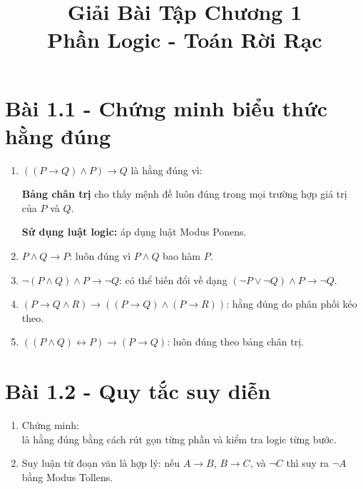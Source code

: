 \documentclass[12pt]{article}
\title{Giải Bài Tập Chương 1 \\[0.5em] \large Phần Logic - Toán Rời Rạc}
\date{}
\begin{document}
\maketitle

\section*{Bài 1.1 - Chứng minh biểu thức hằng đúng}

\begin{enumerate}[label=\alph*)]
    \item $((P \rightarrow Q) \land P) \rightarrow Q$ là hằng đúng vì:

    \textbf{Bảng chân trị} cho thấy mệnh đề luôn đúng trong mọi trường hợp giá trị của $P$ và $Q$.

    \textbf{Sử dụng luật logic:} áp dụng luật Modus Ponens.

    \item $P \land Q \rightarrow P$: luôn đúng vì $P \land Q$ bao hàm $P$.

    \item $\neg(P \land Q) \land P \rightarrow \neg Q$: có thể biến đổi về dạng $(\neg P \lor \neg Q) \land P \rightarrow \neg Q$.

    \item $(P \rightarrow Q \land R) \rightarrow ((P \rightarrow Q) \land (P \rightarrow R))$: hằng đúng do phân phối kéo theo.

    \item $((P \land Q) \leftrightarrow P) \rightarrow (P \rightarrow Q)$: luôn đúng theo bảng chân trị.
\end{enumerate}

\section*{Bài 1.2 - Quy tắc suy diễn}

\begin{enumerate}[label=\alph*)]
    \item Chứng minh: \\[((X_1 \rightarrow X_2) \land (\neg X_3 \lor X_4) \land (X_1 \lor X_3)) \rightarrow (\neg X_2 \rightarrow X_4)\\] là hằng đúng bằng cách rút gọn từng phần và kiểm tra logic từng bước.

    \item Suy luận từ đoạn văn là hợp lý: nếu $A \rightarrow B$, $B \rightarrow C$, và $\neg C$ thì suy ra $\neg A$ bằng Modus Tollens.
\end{enumerate}
\end{document}
